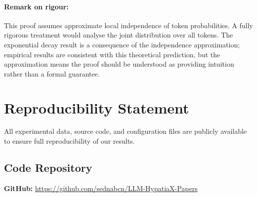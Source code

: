 \documentclass[11pt,a4paper]{article}
\begin{document}
\paragraph{Remark on rigour:} This proof assumes approximate local independence of token probabilities. A fully rigorous treatment would analyse the joint distribution over all tokens. The exponential decay result is a consequence of the independence approximation; empirical results are consistent with this theoretical prediction, but the approximation means the proof should be understood as providing intuition rather than a formal guarantee\citep{kambhampati2024llms}.



\section{Reproducibility Statement}
\label{app:reproducibility}

All experimental data, source code, and configuration files are publicly
available to ensure full reproducibility of our results.

\subsection{Code Repository}

\textbf{GitHub:} \url{https://github.com/sednabcn/LLM-HypatiaX-Papers}
\end{document}

